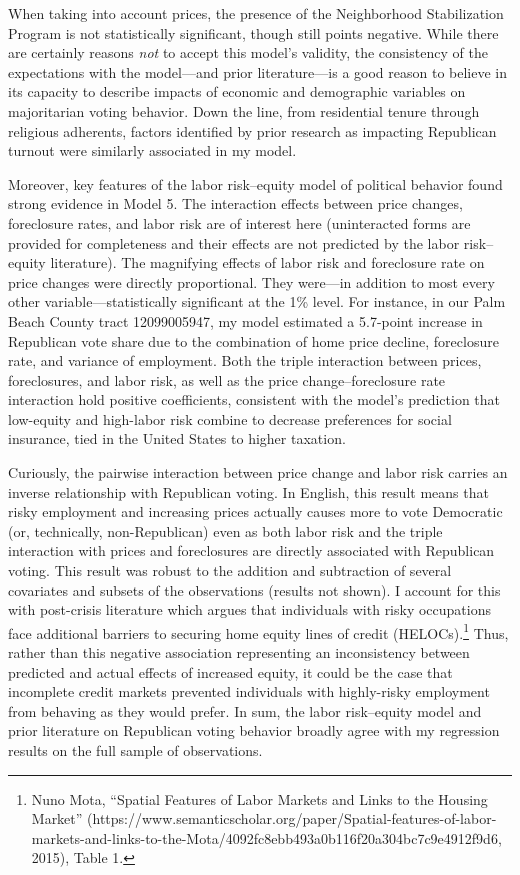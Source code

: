 \documentclass[12pt,oneside]{psthesis}
\begin{document}
When taking into account prices, the presence of the Neighborhood Stabilization Program is not statistically significant, though still points negative.
While there are certainly reasons \emph{not} to accept this model's validity, the consistency of the expectations with the model---and prior literature---is a good reason to believe in its capacity to describe impacts of economic and demographic variables on majoritarian voting behavior.
Down the line, from residential tenure through religious adherents, factors identified by prior research as impacting Republican turnout were similarly associated in my model.

Moreover, key features of the labor risk--equity model of political behavior found strong evidence in Model 5.
The interaction effects between price changes, foreclosure rates, and labor risk are of interest here (uninteracted forms are provided for completeness and their effects are not predicted by the labor risk--equity literature).
The magnifying effects of labor risk and foreclosure rate on price changes were directly proportional.
They were---in addition to most every other variable---statistically significant at the 1\% level.
For instance, in our Palm Beach County tract 12099005947, my model estimated a 5.7-point increase in Republican vote share due to the combination of home price decline, foreclosure rate, and variance of employment.
Both the triple interaction between prices, foreclosures, and labor risk, as well as the price change--foreclosure rate interaction hold positive coefficients, consistent with the model's prediction that low-equity and high-labor risk combine to decrease preferences for social insurance, tied in the United States to higher taxation.

Curiously, the pairwise interaction between price change and labor risk carries an inverse relationship with Republican voting.
In English, this result means that risky employment and increasing prices actually causes more to vote Democratic (or, technically, non-Republican) even as both labor risk and the triple interaction with prices and foreclosures are directly associated with Republican voting.
This result was robust to the addition and subtraction of several covariates and subsets of the observations (results not shown).
I account for this with post-crisis literature which argues that individuals with risky occupations face additional barriers to securing home equity lines of credit (HELOCs).\footnote{Nuno Mota, ``Spatial Features of Labor Markets and Links to the Housing Market'' (https://www.semanticscholar.org/paper/Spatial-features-of-labor-markets-and-links-to-the-Mota/4092fc8ebb493a0b116f20a304bc7c9e4912f9d6, 2015), Table 1.}
Thus, rather than this negative association representing an inconsistency between predicted and actual effects of increased equity, it could be the case that incomplete credit markets prevented individuals with highly-risky employment from behaving as they would prefer.
In sum, the labor risk--equity model and prior literature on Republican voting behavior broadly agree with my regression results on the full sample of observations.
\end{document}
